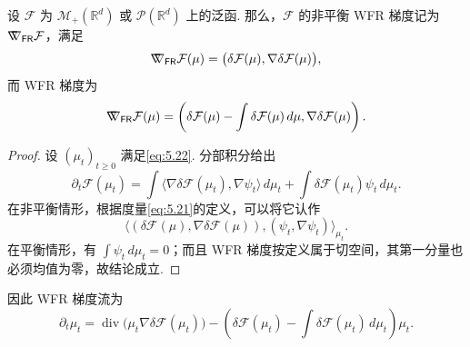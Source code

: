 \begin{theorem}\label{thm:5.24}
设 $\mathcal F$ 为 $\mathcal M_+(\mathbb R^d)$ 或 $\mathcal P(\mathbb R^d)$ 上的泛函. 那么，$\mathcal F$ 的非平衡 WFR 梯度记为 $\nabla\mkern-10mu\nabla_{\mathsf{FR}}\mathcal F$，满足
$$
\nabla\mkern-10mu\nabla_{\mathsf{FR}}\mathcal F(\mu)
=\bigl(\delta\mathcal F(\mu),\nabla\delta\mathcal F(\mu)\bigr),
$$
而 WFR 梯度为
$$
\nabla\mkern-10mu\nabla_{\mathsf{FR}}\mathcal F(\mu)
=\left(\delta\mathcal F(\mu)-\int\delta\mathcal F(\mu)\,d\mu,\nabla\delta\mathcal F(\mu)\right).
$$
\end{theorem}
\begin{proof}
设 $(\mu_t)_{t\geq0}$ 满足\eqref{eq:5.22}. 分部积分给出
$$
\partial_t\mathcal F(\mu_t)
=\int\langle\nabla\delta\mathcal F(\mu_t),\nabla\psi_t\rangle\,d\mu_t
+\int\delta\mathcal F(\mu_t)\psi_t\,d\mu_t.
$$
在非平衡情形，根据度量\eqref{eq:5.21}的定义，可以将它认作
$$
\langle(\delta\mathcal F(\mu),\nabla\delta\mathcal F(\mu)),(\psi_t,\nabla\psi_t)\rangle_{\mu_t}.
$$
在平衡情形，有 $\int\psi_t\,d\mu_t=0$；而且 WFR 梯度按定义属于切空间，其第一分量也必须均值为零，故结论成立.
\end{proof}

因此 WFR 梯度流为
\begin{equation}\label{eq:5.23}
\partial_t\mu_t=\operatorname{div}\bigl(\mu_t\nabla\delta\mathcal F(\mu_t)\bigr)
-\left(\delta\mathcal F(\mu_t)-\int\delta\mathcal F(\mu_t)\,d\mu_t\right)\mu_t.
\end{equation}
